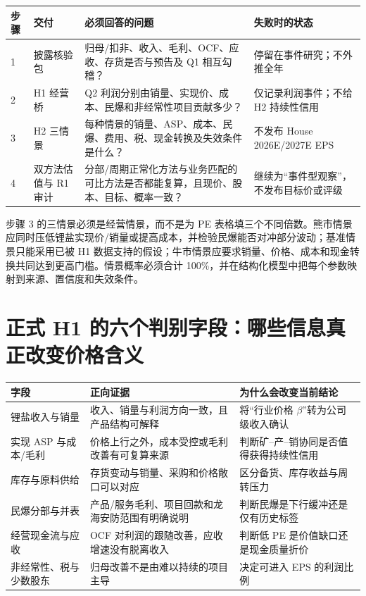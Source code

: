 \begin{exhibitbox}[从 H1 披露到完整覆盖的四步作业卡]
\begin{tabularx}{\exhibitboxwidth}{L{1.4cm}L{2.2cm}X X}
\toprule
步骤 & 交付 & 必须回答的问题 & 失败时的状态 \\
 & 披露核验包 & 归母/扣非、收入、毛利、OCF、应收、存货是否与预告及 Q1 相互勾稽？ & 停留在事件研究；不外推全年 \\
2 & H1 经营桥 & Q2 利润分别由销量、实现价、成本、民爆和非经常性项目贡献多少？ & 仅记录利润事件；不给 H2 持续性信用 \\
3 & H2 三情景 & 每种情景的销量、ASP、成本、民爆、费用、税、现金转换及失效条件是什么？ & 不发布 House 2026E/2027E EPS \\
4 & 双方法估值与 R1 审计 & 分部/周期正常化方法与业务匹配的可比方法是否都能复算，且现价、股本、目标、概率一致？ & 继续为“事件型观察”，不发布目标价或评级 \\
\bottomrule
\end{tabularx}
\end{exhibitbox}

步骤 3 的三情景必须是经营情景，而不是为 PE 表格填三个不同倍数。熊市情景应同时压低锂盐实现价/销量或提高成本，并检验民爆能否对冲部分波动；基准情景只能采用已被 H1 数据支持的假设；牛市情景应要求销量、价格、成本和现金转换共同达到更高门槛。情景概率必须合计 100\%，并在结构化模型中把每个参数映射到来源、置信度和失效条件。

\section{正式 H1 的六个判别字段：哪些信息真正改变价格含义}

\begin{exhibitbox}
\begin{tabularx}{\exhibitboxwidth}{L{2.6cm}X X}
\toprule
字段 & 正向证据 & 为什么会改变当前结论 \\
\midrule
锂盐收入与销量 & 收入、销量与利润方向一致，且产品结构可解释 & 将“行业价格 $\beta$”转为公司级收入确认 \\
实现 ASP 与成本/毛利 & 价格上行之外，成本受控或毛利改善有可复算来源 & 判断矿--产--销协同是否值得获得持续性信用 \\
库存与原料供给 & 存货变动与销量、采购和价格敞口可以对应 & 区分备货、库存收益与周转压力 \\
民爆分部与并表 & 产品/服务毛利、项目回款和龙海安防范围有明确说明 & 判断民爆是下行缓冲还是仅有历史标签 \\
经营现金流与应收 & OCF 对利润的跟随改善，应收增速没有脱离收入 & 判断低 PE 是价值缺口还是现金质量折价 \\
非经常性、税与少数股东 & 归母改善不是由难以持续的项目主导 & 决定可进入 EPS 的利润比例 \\
\bottomrule
\end{tabularx}
\end{exhibitbox}

